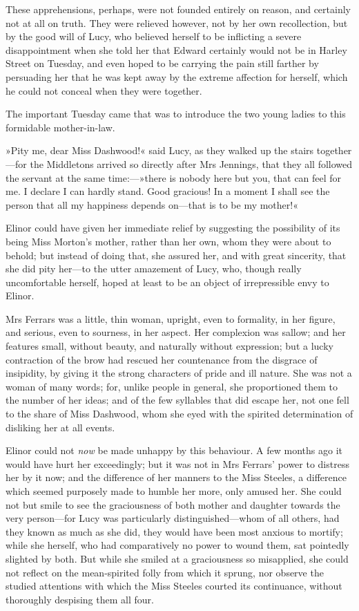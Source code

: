 These apprehensions, perhaps, were not founded entirely on reason, and certainly not at all on truth. They were relieved however, not by her own recollection, but by the good will of Lucy, who believed herself to be inflicting a severe disappointment when she told her that Edward certainly would not be in Harley Street on Tuesday, and even hoped to be carrying the pain still farther by persuading her that he was kept away by the extreme affection for herself, which he could not conceal when they were together.

The important Tuesday came that was to introduce the two young ladies to this formidable mother-in-law.

»Pity me, dear Miss Dashwood!« said Lucy, as they walked up the stairs together—for the Middletons arrived so directly after Mrs Jennings, that they all followed the servant at the same time:—»there is nobody here but you, that can feel for me. I declare I can hardly stand. Good gracious! In a moment I shall see the person that all my happiness depends on—that is to be my mother!«

Elinor could have given her immediate relief by suggesting the possibility of its being Miss Morton’s mother, rather than her own, whom they were about to behold; but instead of doing that, she assured her, and with great sincerity, that she did pity her—to the utter amazement of Lucy, who, though really uncomfortable herself, hoped at least to be an object of irrepressible envy to Elinor.

Mrs Ferrars was a little, thin woman, upright, even to formality, in her figure, and serious, even to sourness, in her aspect. Her complexion was sallow; and her features small, without beauty, and naturally without expression; but a lucky contraction of the brow had rescued her countenance from the disgrace of insipidity, by giving it the strong characters of pride and ill nature. She was not a woman of many words; for, unlike people in general, she proportioned them to the number of her ideas; and of the few syllables that did escape her, not one fell to the share of Miss Dashwood, whom she eyed with the spirited determination of disliking her at all events.

Elinor could not \textit{now} be made unhappy by this behaviour. A few months ago it would have hurt her exceedingly; but it was not in Mrs Ferrars’ power to distress her by it now; and the difference of her manners to the Miss Steeles, a difference which seemed purposely made to humble her more, only amused her. She could not but smile to see the graciousness of both mother and daughter towards the very person—for Lucy was particularly distinguished—whom of all others, had they known as much as she did, they would have been most anxious to mortify; while she herself, who had comparatively no power to wound them, sat pointedly slighted by both. But while she smiled at a graciousness so misapplied, she could not reflect on the mean-spirited folly from which it sprung, nor observe the studied attentions with which the Miss Steeles courted its continuance, without thoroughly despising them all four.


